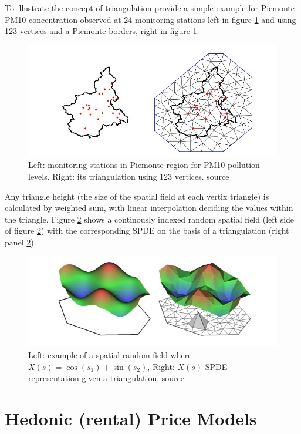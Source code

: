 \documentclass[
  12pt,
  a4paper,
  oneside]{book}
\theoremstyle{definition}
\theoremstyle{definition}
\theoremstyle{definition}
\theoremstyle{remark}
\begin{document}
To illustrate the concept of triangulation \citet{Cameletti2012} provide a simple example for Piemonte PM10 concentration observed at 24 monitoring stations left in figure \ref{fig:piepm10} and using 123 vertices and a Piemonte borders, right in figure \ref{fig:piepm10}.

\begin{figure}
\centering
\includegraphics{images/piemonte_pm10.jpg}
\caption{\label{fig:piepm10}Left: monitoring stations in Piemonte region for PM10 pollution levels. Right: its triangulation using 123 vertices. \citet{Cameletti2012} source}
\end{figure}

Any triangle height (the size of the spatial field at each vertix triangle) is calculated by weighted sum, with linear interpolation deciding the values within the triangle. Figure \ref{fig:spdesurf} shows a continously indexed random spatial field (left side of figure \ref{fig:spdesurf}) with the corresponding SPDE on the basis of a triangulation (right panel \ref{fig:spdesurf}).

\begin{figure}
\centering
\includegraphics{images/spde_indexedsurface.jpg}
\caption{\label{fig:spdesurf}Left: example of a spatial random field where \(X(s)= \cos(s_1)+\sin(s_2)\), Right: \(X(s)\) SPDE representation given a triangulation, \citet{Cameletti2012} source}
\end{figure}

\hypertarget{hedonic-rental-price-models}{%
\section{Hedonic (rental) Price Models}\label{hedonic-rental-price-models}}
\end{document}
